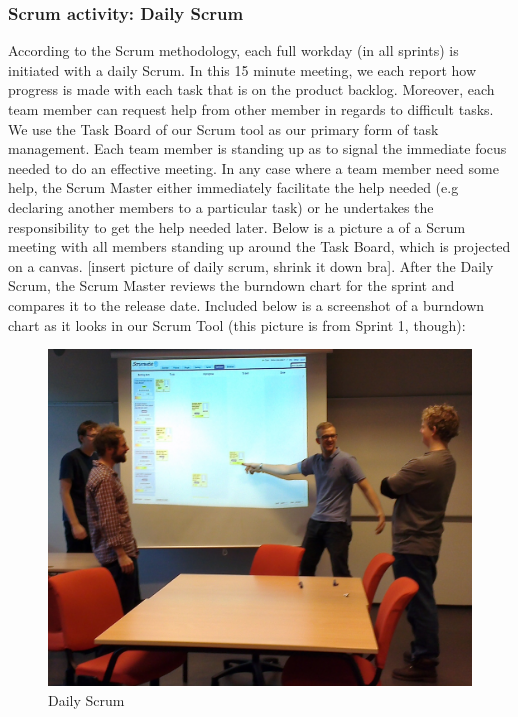 \subsubsection{Scrum activity: Daily Scrum}
According to the Scrum methodology, each full workday (in all sprints) is initiated with a daily Scrum. In this 15 minute meeting, we each report how progress is made with each task that is on the product backlog. Moreover, each team member can request help from other member in regards to difficult tasks. We use the Task Board of our Scrum tool as our primary form of task management. Each team member is standing up as to signal the immediate focus needed to do an effective meeting. In any case where a team member need some help, the Scrum Master either immediately facilitate the help needed (e.g declaring another members to a particular task) or he undertakes the responsibility to get the help needed later. Below is a picture a of a Scrum meeting with all members standing up around the Task Board, which is projected on a canvas.
[insert picture of daily scrum, shrink it down bra]. 
After the Daily Scrum, the Scrum Master reviews the burndown chart for the sprint and compares it to the release date. Included below is a screenshot of a burndown chart as it looks in our Scrum Tool (this picture is from Sprint 1, though):
\begin{figure}[H]
  \includegraphics[width=\textwidth,natwidth=1696,natheight=1349]{illustrations/Daily.jpg}
  \caption{Daily Scrum}
  \label{dailyscrum}
\end{figure}


